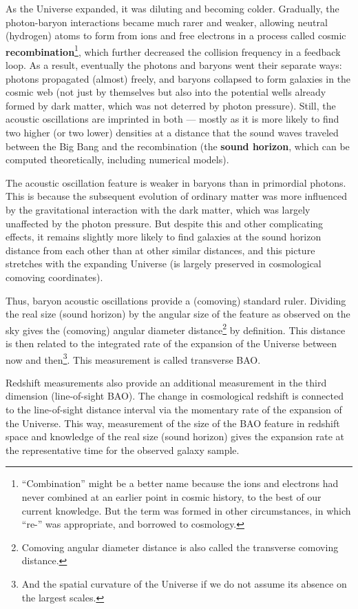 As the Universe expanded, it was diluting and becoming colder.
Gradually, the photon-baryon interactions became much rarer and weaker, allowing neutral (hydrogen) atoms to form from ions and free electrons in a process called cosmic {\bf recombination}\footnote{``Combination'' might be a better name because the ions and electrons had never combined at an earlier point in cosmic history, to the best of our current knowledge. But the term was formed in other circumstances, in which ``re-'' was appropriate, and borrowed to cosmology.}, which further decreased the collision frequency in a feedback loop.
As a result, eventually the photons and baryons went their separate ways: photons propagated (almost) freely, and baryons collapsed to form galaxies in the cosmic web (not just by themselves but also into the potential wells already formed by dark matter, which was not deterred by photon pressure).
Still, the acoustic oscillations are imprinted in both --- mostly as it is more likely to find two higher (or two lower) densities at a distance that the sound waves traveled between the Big Bang and the recombination (the {\bf sound horizon}, which can be computed theoretically, including numerical models).
\citep[This description largely follows][.]{Sunyaev-Zeldovich-1970,Peebles-Yu-1970}

The acoustic oscillation feature is weaker in baryons than in primordial photons.
This is because the subsequent evolution of ordinary matter was more influenced by the gravitational interaction with the dark matter, which was largely unaffected by the photon pressure.
But despite this and other complicating effects, it remains slightly more likely to find galaxies at the sound horizon distance from each other than at other similar distances, and this picture stretches with the expanding Universe (is largely preserved in cosmological comoving coordinates).

Thus, baryon acoustic oscillations provide a (comoving) standard ruler.
Dividing the real size (sound horizon) by the angular size of the feature as observed on the sky gives the (comoving) angular diameter distance\footnote{Comoving angular diameter distance is also called the transverse comoving distance.} by definition.
This distance is then related to the integrated rate of the expansion of the Universe between now and then\footnote{And the spatial curvature of the Universe if we do not assume its absence on the largest scales.}.
This measurement is called transverse BAO.

Redshift measurements also provide an additional measurement in the third dimension (line-of-sight BAO).
The change in cosmological redshift is connected to the line-of-sight distance interval via the momentary rate of the expansion of the Universe.
This way, measurement of the size of the BAO feature in redshift space and knowledge of the real size (sound horizon) gives the expansion rate at the representative time for the observed galaxy sample.

